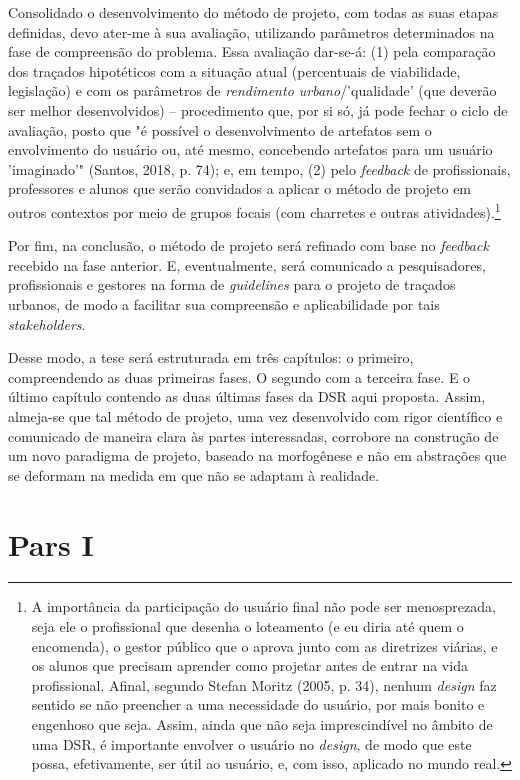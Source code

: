 \documentclass[]{report}
\begin{document}
    Consolidado o desenvolvimento do método de projeto, com todas as suas etapas definidas, devo ater-me à sua avaliação, utilizando parâmetros determinados na fase de compreensão do problema. Essa avaliação dar-se-á: (1) pela comparação dos traçados hipotéticos com a situação atual (percentuais de viabilidade, legislação) e com os parâmetros de \textit{rendimento urbano}/'qualidade' (que deverão ser melhor desenvolvidos) – procedimento que, por si só, já pode fechar o ciclo de avaliação, posto que "é possível o desenvolvimento de artefatos sem o envolvimento do usuário ou, até mesmo, concebendo artefatos para um usuário 'imaginado'" (Santos, 2018, p. 74); e, em tempo, (2) pelo \textit{feedback} de profissionais, professores e alunos que serão convidados a aplicar o método de projeto em outros contextos por meio de grupos focais (com charretes e outras atividades).\footnote[2]{A importância da participação do usuário final não pode ser menosprezada, seja ele o profissional que desenha o loteamento (e eu diria até quem o encomenda), o gestor público que o aprova junto com as diretrizes viárias, e os alunos que precisam aprender como projetar antes de entrar na vida profissional. Afinal, segundo Stefan Moritz (2005, p. 34), nenhum \textit{design} faz sentido se não preencher a uma necessidade do usuário, por mais bonito e engenhoso que seja. Assim, ainda que não seja imprescindível no âmbito de uma DSR, é importante envolver o usuário no \textit{design}, de modo que este possa, efetivamente, ser útil ao usuário, e, com isso, aplicado no mundo real.} 

    Por fim, na conclusão, o método de projeto será refinado com base no \textit{feedback} recebido na fase anterior. E, eventualmente, será comunicado a pesquisadores, profissionais e gestores na forma de \textit{guidelines} para o projeto de traçados urbanos, de modo a facilitar sua compreensão e aplicabilidade por tais \textit{stakeholders}. 
    
    Desse modo, a tese será estruturada em três capítulos: o primeiro, compreendendo as duas primeiras fases. O segundo com a terceira fase. E o último capítulo contendo as duas últimas fases da DSR aqui proposta. Assim, almeja-se que tal método de projeto, uma vez desenvolvido com rigor científico e comunicado de maneira clara às partes interessadas, corrobore na construção de um novo paradigma de projeto, baseado na morfogênese e não em abstrações que se deformam na medida em que não se adaptam à realidade.

\part{Pars I}
\end{document}
